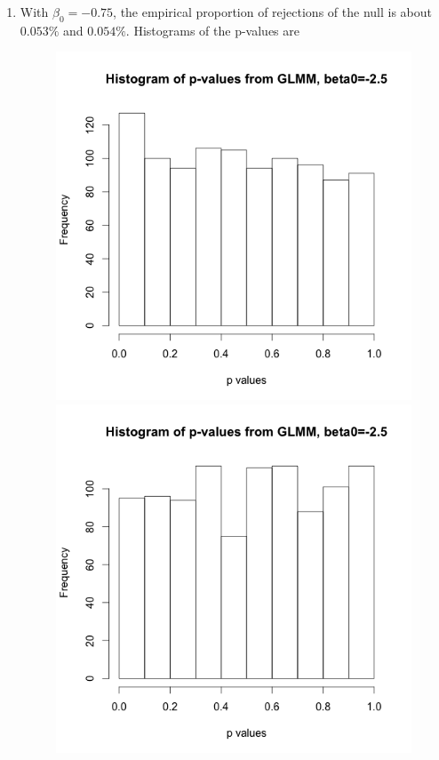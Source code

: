 \documentclass[11pt]{article}
\begin{document}
\begin{enumerate}
\begin{enumerate}
		\item With $\beta_0=-0.75$, the empirical proportion of rejections of the null is about $0.053\%$ and $0.054\%$. Histograms of the p-values are
		\begin{figure}[H]
			\includegraphics[scale=0.4]{Rplotp5b}
			\includegraphics[scale=0.4]{Rplotp5c}
		\end{figure}
		

\end{enumerate}
\end{enumerate}
\end{document}

